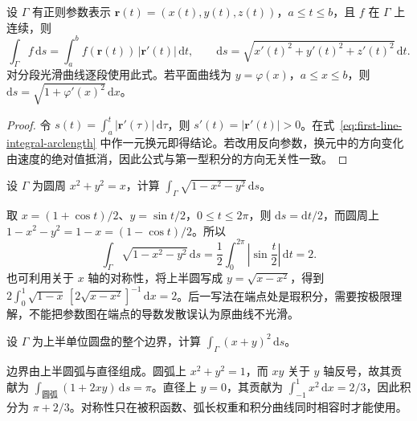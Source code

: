 \documentclass[UTF8,12pt,a4paper,fontset=fandol]{ctexbook}
\begin{document}
\begin{theorem}
\label{thm:first-line-integral-parametric}
设 $\Gamma$ 有正则参数表示 $\boldsymbol r(t)=(x(t),y(t),z(t))$，$a\leq t\leq b$，且 $f$ 在 $\Gamma$ 上连续，则
\begin{equation}
\label{eq:first-line-integral-parametric}
    \int_\Gamma f\,\mathrm ds
    =\int_a^b f(\boldsymbol r(t))\,|\boldsymbol r'(t)|\,\mathrm dt,
    \qquad
    \mathrm ds=\sqrt{x'(t)^2+y'(t)^2+z'(t)^2}\,\mathrm dt.
\end{equation}
对分段光滑曲线逐段使用此式。若平面曲线为 $y=\varphi(x)$，$a\leq x\leq b$，则 $\mathrm ds=\sqrt{1+\varphi'(x)^2}\,\mathrm dx$。
\end{theorem}

\begin{proof}
令 $s(t)=\int_a^t|\boldsymbol r'(\tau)|\,\mathrm d\tau$，则 $s'(t)=|\boldsymbol r'(t)|>0$。在式~\eqref{eq:first-line-integral-arclength} 中作一元换元即得结论。若改用反向参数，换元中的方向变化由速度的绝对值抵消，因此公式与第一型积分的方向无关性一致。
\end{proof}

\begin{example}
\label{ex:first-line-integral-offset-circle}
设 $\Gamma$ 为圆周 $x^2+y^2=x$，计算 $\int_\Gamma\sqrt{1-x^2-y^2}\,\mathrm ds$。
\end{example}
\begin{solve}
取 $x=(1+\cos t)/2$、$y=\sin t/2$，$0\leq t\leq2\pi$，则 $\mathrm ds=\mathrm dt/2$，而圆周上 $1-x^2-y^2=1-x=(1-\cos t)/2$。所以
\[
    \int_\Gamma\sqrt{1-x^2-y^2}\,\mathrm ds
    =\frac12\int_0^{2\pi}\left|\sin\frac t2\right|\,\mathrm dt=2.
\]
也可利用关于 $x$ 轴的对称性，将上半圆写成 $y=\sqrt{x-x^2}$，得到 $2\int_0^1\sqrt{1-x}\,[2\sqrt{x-x^2}]^{-1}\,\mathrm dx=2$。后一写法在端点处是瑕积分，需要按极限理解，不能把参数图在端点的导数发散误认为原曲线不光滑。
\end{solve}

\begin{example}
\label{ex:first-line-integral-semicircle-boundary}
设 $\Gamma$ 为上半单位圆盘的整个边界，计算 $\int_\Gamma(x+y)^2\,\mathrm ds$。
\end{example}
\begin{solve}
边界由上半圆弧与直径组成。圆弧上 $x^2+y^2=1$，而 $xy$ 关于 $y$ 轴反号，故其贡献为 $\int_{\text{圆弧}}(1+2xy)\,\mathrm ds=\pi$。直径上 $y=0$，其贡献为 $\int_{-1}^1x^2\,\mathrm dx=2/3$，因此积分为 $\pi+2/3$。对称性只在被积函数、弧长权重和积分曲线同时相容时才能使用。
\end{solve}
\end{document}
